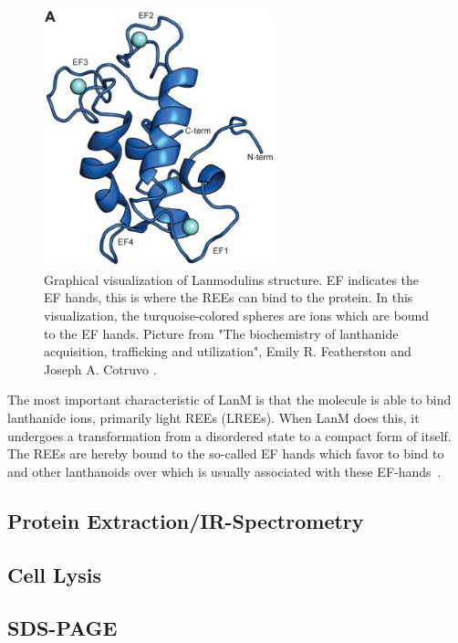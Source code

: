\begin{figure}[H]
    \centering
    \includegraphics[width=0.6\textwidth]{./media/images/lanm_structure}
    \caption{Graphical visualization of Lanmodulins structure. EF indicates the EF hands, this is where the REEs can bind to the protein. In this visualization, the turquoise-colored spheres are  ions which are bound to the EF hands. Picture from "The biochemistry of lanthanide acquisition, trafficking and utilization", Emily R. Featherston and Joseph A. Cotruvo \cite{lanmroleinbiology}.}
    \label{fig:lanm_structure}
\end{figure}

The most important characteristic of LanM is that the molecule is able to bind lanthanide ions, primarily light REEs (LREEs).
When LanM does this, it undergoes a transformation from a disordered state to a compact form of itself.
The REEs are hereby bound to the so-called EF hands which favor to bind to  and other lanthanoids over  which is usually associated with these EF-hands~\cite{lanmstructure}.


\subsection{Protein Extraction/IR-Spectrometry\authorB{}}


\subsection{Cell Lysis\authorB{}}

\subsection{SDS-PAGE\authorB{}}
